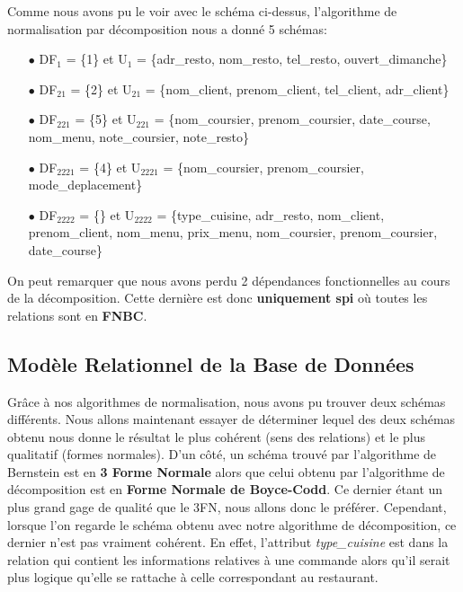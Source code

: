 \documentclass[french]{article}
\begin{document}
            Comme nous avons pu le voir avec le schéma ci-dessus, l'algorithme de normalisation par décomposition nous a donné 5 schémas:\bigskip
            \begin{enumerate}
                \item[$\bullet$] DF$_{1}$ = \{1\} et U$_{1}$ = \{adr\_resto, nom\_resto, tel\_resto, ouvert\_dimanche\}
                \item[$\bullet$] DF$_{21}$ = \{2\} et U$_{21}$ = \{nom\_client, prenom\_client, tel\_client, adr\_client\}
                \item[$\bullet$] DF$_{221}$ = \{5\} et U$_{221}$ = \{nom\_coursier, prenom\_coursier, date\_course, nom\_menu, \newline note\_coursier, note\_resto\}
                \item[$\bullet$] DF$_{2221}$ = \{4\} et U$_{2221}$ = \{nom\_coursier, prenom\_coursier, mode\_deplacement\}
                \item[$\bullet$] DF$_{2222}$ = \{\} et U$_{2222}$ = \{type\_cuisine, adr\_resto, nom\_client, prenom\_client, nom\_menu, prix\_menu, nom\_coursier, prenom\_coursier, date\_course\}\bigskip
            \end{enumerate}
            
            \noindent
            On peut remarquer que nous avons perdu 2 dépendances fonctionnelles au cours de la décomposition. Cette dernière est donc \textbf{uniquement spi} où toutes les relations sont en \textbf{FNBC}.
            
        \subsection*{Modèle Relationnel de la Base de Données}
            Grâce à nos algorithmes de normalisation, nous avons pu trouver deux schémas différents. Nous allons maintenant essayer de déterminer lequel des deux schémas obtenu nous donne le résultat le plus cohérent (sens des relations) et le plus qualitatif (formes normales).\newline
            D'un côté, un schéma trouvé par l'algorithme de Bernstein est en \textbf{3 Forme Normale} alors que celui obtenu par l'algorithme de décomposition est en \textbf{Forme Normale de Boyce-Codd}. Ce dernier étant un plus grand gage de qualité que le 3FN, nous allons donc le préférer.\newline
            Cependant, lorsque l'on regarde le schéma obtenu avec notre algorithme de décomposition, ce dernier n'est pas vraiment cohérent. En effet, l'attribut \emph{type\_cuisine} est dans la relation qui contient les informations relatives à une commande alors qu'il serait plus logique qu'elle se rattache à celle correspondant au restaurant.\bigskip
\end{document}

